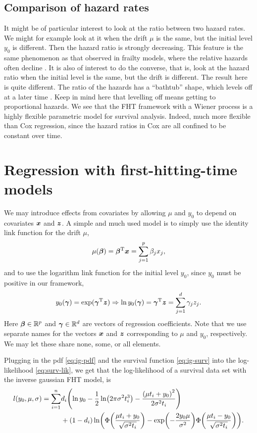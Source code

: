 \subsection{Comparison of hazard rates}
It might be of particular interest to look at the ratio between two hazard rates. We might for example look at it when the drift $\mu$ is the same, but the initial level $y_0$ is different. Then the hazard ratio is strongly decreasing. This feature is the same phenomenon as that observed in frailty models, where the relative hazards often decline \citep{ABG}.
It is also of interest to do the converse, that is, look at the hazard ratio when the initial level is the same, but the drift is different. The result here is quite different.
The ratio of the hazards has a ``bathtub'' shape, which levels off at a later time \citep{ABG}.
Keep in mind here that levelling off means getting to proportional hazards.
We see that the FHT framework with a Wiener process is a highly flexible parametric model for survival analysis. Indeed, much more flexible than Cox regression, since the hazard ratios in Cox are all confined to be constant over time.

\section{Regression with first-hitting-time models}\label{subsec:IG-reg}
We may introduce effects from covariates by allowing $\mu$ and $y_0$ to depend on covariates $\bm{x}$ and $\bm{z}$.
A simple and much used model \citep{leewhitmore2006, caroni2017} is to simply use the identity link function for the drift $\mu$,
\begin{equation}\label{eq:y0}
    \mu(\boldsymbol{\beta})=\boldsymbol{\beta}^{\text{T}}\bm{x}=\sum_{j=1}^p \beta_jx_j,
\end{equation}
and to use the logarithm link function for the initial level $y_0$, since $y_0$ must be positive in our framework,
\begin{equation}\label{eq:mu}
    y_0(\boldsymbol{\gamma})=\exp(\boldsymbol{\gamma}^{\text{T}}\bm{z})\Rightarrow\ln y_0(\boldsymbol{\gamma})=\boldsymbol{\gamma}^{\text{T}}\bm{z}=\sum_{j=1}^d \gamma_jz_j.
\end{equation}
Here $\boldsymbol{\beta}\in\mathbb{R}^p$ and $\boldsymbol{\gamma}\in\mathbb{R}^d$ are vectors of regression coefficients.
Note that we use separate names for the vectors $\bm{x}$ and $\bm{z}$ corresponding to $\mu$ and $y_0$, respectively.
We may let these share none, some, or all elements.

Plugging in the pdf \eqref{eq:ig-pdf} and the survival function \eqref{eq:ig-surv} into the log-likelihood \eqref{eq:surv-lik}, we get that the log-likelihood of a survival data set with the inverse gaussian FHT model, is
\begin{align}\label{eq:loglik}
\begin{split}
    l(y_0,\mu,\sigma)=\sum_{i=1}^n&d_i\p*{\ln y_0-\frac{1}{2}\ln\p*{2\pi\sigma^2\ti^3}-\frac{\p*{\mu\ti+y_0}^2}{2\sigma^2\ti}} \\
    &+
    (1-d_i)\ln\p*{\Phi\p*{\frac{\mu\ti+y_0}{\sqrt{\sigma^2\ti}}}-\exp\p*{-\frac{2y_0\mu}{\sigma^2}}\Phi\p*{\frac{\mu\ti-y_0}{\sqrt{\sigma^2\ti}}}}.
\end{split}
\end{align}

